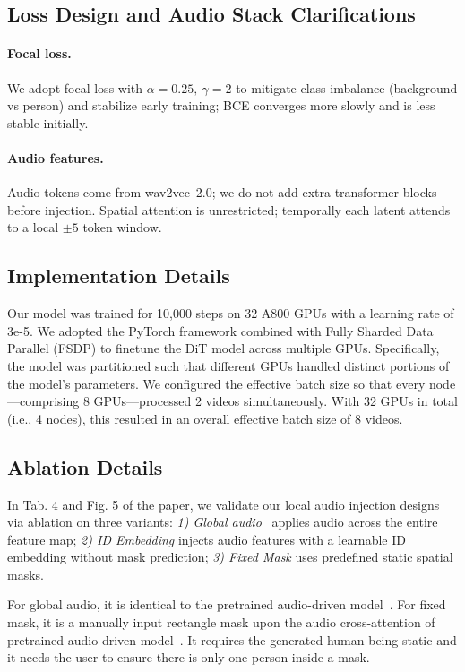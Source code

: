 \documentclass{article} %
\begin{document}
\subsection{Loss Design and Audio Stack Clarifications}
\paragraph{Focal loss.}
We adopt focal loss with $\alpha=0.25,\ \gamma=2$ to mitigate class imbalance (background vs person) and stabilize early training; BCE converges more slowly and is less stable initially.

\paragraph{Audio features.}
Audio tokens come from wav2vec~2.0; we do not add extra transformer blocks before injection. Spatial attention is unrestricted; temporally each latent attends to a local $\pm5$ token window.



\subsection{Implementation Details}
Our model was trained for 10,000 steps on 32 A800 GPUs with a learning rate of 3e-5. We adopted the PyTorch framework combined with Fully Sharded Data Parallel (FSDP) to finetune the DiT model across multiple GPUs. Specifically, the model was partitioned such that different GPUs handled distinct portions of the model’s parameters. We configured the effective batch size so that every node—comprising 8 GPUs—processed 2 videos simultaneously. With 32 GPUs in total (i.e., 4 nodes), this resulted in an overall effective batch size of 8 videos.
\subsection{Ablation Details}
In Tab. 4 and Fig. 5 of the paper, we validate our local audio injection designs via ablation on three variants: \emph{1) Global audio}~\citep{lin2025omnihuman} applies audio across the entire feature map;
\emph{2) ID Embedding} injects audio features with a learnable ID embedding without mask prediction;
\emph{3) Fixed Mask} uses predefined static spatial masks.

For global audio, it is identical to the pretrained audio-driven model~\citep{lin2025omnihuman}. For fixed mask, it is a manually input rectangle mask upon the audio cross-attention of pretrained audio-driven model~\citep{lin2025omnihuman}. It requires the generated human being static and it needs the user to ensure there is only one person inside a mask.
\end{document}
